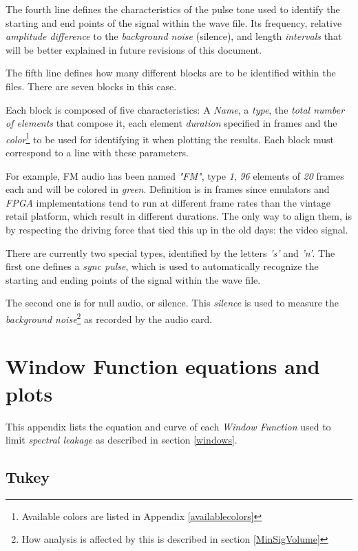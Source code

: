 \documentclass[10pt,a4paper]{report}
\begin{document}
\begin{appendices}
The fourth line defines the characteristics of the pulse tone used to identify the starting and end points of the signal within the wave file. Its frequency, relative \textit{amplitude difference} to the \textit{background noise} (silence), and length \textit{intervals} that will be better explained in future revisions of this document.

The fifth line defines how many different blocks are to be identified within the files. There are seven blocks in this case.

Each block is composed of five characteristics: A \textit{Name}, a \textit{type}, the \textit{total number of elements} that compose it, each element \textit{duration} specified in frames and the \textit{color}\footnote{Available colors are listed in Appendix \ref{availablecolors}} to be used for identifying it when plotting the results. Each block must correspond to a line with these parameters.

For example, FM audio has been named \textit{"FM"}, type \textit{1}, \textit{96} elements of \textit{20} frames each and will be colored in \textit{green}. Definition is in frames since emulators and \textit{FPGA} implementations tend to run at different frame rates than the vintage retail platform, which result in different durations. The only way to align them, is by respecting the driving force that tied this up in the old days: the video signal.

There are currently two special types, identified by the letters \textit{'s'} and \textit{'n'}. The first one defines a \textit{sync pulse}, which is used to automatically recognize the starting and ending points of the signal within the wave file. 

The second one is for null audio, or silence. This \textit{silence} is used to measure the \textit{background noise}\footnote{How analysis is affected by this is described in section \ref{MinSigVolume}} as recorded by the audio card. 	

\chapter{Window Function equations and plots}
\label{windowfunctiondetails}

This appendix lists the equation and curve of each \textit{Window Function} used to limit \textit{spectral leakage} as described in section \ref{windows}.

\newpage
\section{Tukey}


\end{appendices}
\end{document}
